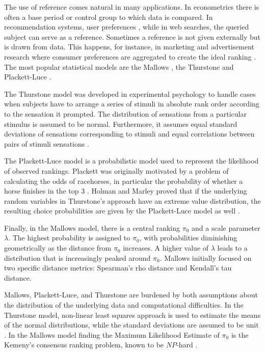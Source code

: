 The use of reference comes natural in many applications. In econometrics there is often a base period or control group to which data is compared. In recommendation systems, user preferences \citep{Bhowmik2017}, while in web searches, the queried subject \citep{Dwork2001} can serve as a reference. Sometimes a reference is not given externally but is drawn from data. This happens, for instance, in marketing and advertisement research where consumer preferences are aggregated to create the ideal ranking \citep{Lin2010,Haghani2021,Schuster2024}. %
The most popular statistical models are the Mallows \citep{mallowsNONNULLRANKINGMODELS1957}, the Thurstone \citep{thurstone1927law} and Plackett-Luce \citep{luce1959individual,Plackett1975}.

The Thurstone model was developed in experimental psychology to handle cases when subjects have to arrange a series of stimuli in absolute rank order according to the sensation it prompted. The distribution of sensations from a particular stimulus is assumed to be normal. Furthermore, it assumes equal standard deviations of sensations corresponding to stimuli and equal correlations between pairs of stimuli sensations \citep{Mosteller1951}.

The Plackett-Luce model is a probabilistic model used to represent the likelihood of observed rankings. Plackett was originally motivated by a problem of calculating the odds of racehorses, in particular the probability of whether a horse finishes in the top 3 \citep{Plackett1975}. Holman and Marley proved that if the underlying random variables in Thurstone's approach have an extreme value distribution, the resulting choice probabilities are given by the Plackett-Luce model as well \citep{Diaconis1988}.

Finally, in the Mallows model, there is a central ranking $\pi_0$ and a scale parameter $\lambda$. The highest probability is assigned to $\pi_0$, with probabilities diminishing geometrically as the distance from $\pi_0$ increases. A higher value of $\lambda$ leads to a distribution that is increasingly peaked around $\pi_0$. Mallows initially focused on two specific distance metrics: Spearman's rho distance and Kendall's tau distance.

Mallows, Plackett-Luce, and Thurstone are burdened by both assumptions about the distribution of the underlying data and computational difficulties. In the Thurstone model, non-linear least squares approach is used to estimate the means of the normal distributions, while the standard deviations are assumed to be unit \citep{Lin2010}. In the Mallows model finding the Maximum Likelihood Estimate of $\pi_0$ is the Kemeny’s consensus ranking problem, known to be $NP$-hard \citep{tang2019mallows}.

